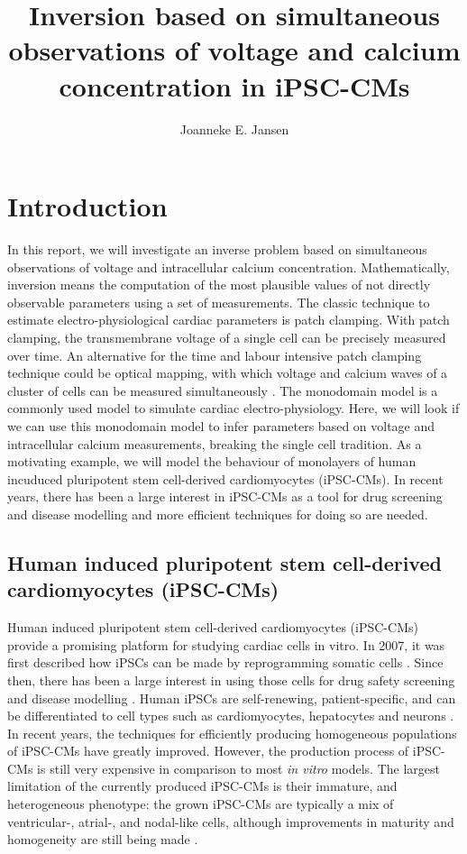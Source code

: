 \documentclass[12pt,a4paper]{article}
\title{Inversion based on simultaneous observations of voltage and calcium concentration in iPSC-CMs}
\author{Joanneke E. Jansen}
\begin{document}
%
\maketitle
%
\section{Introduction} \label{Introduction}
In this report, we will investigate an inverse problem based on simultaneous observations of voltage and intracellular calcium concentration. Mathematically, inversion means the computation of the most plausible values of not directly observable parameters using a set of measurements. The classic technique to estimate electro-physiological cardiac parameters is patch clamping. With patch clamping, the transmembrane voltage of a single cell can be precisely measured over time. An alternative for the time and labour intensive patch clamping technique could be optical mapping, with which voltage and calcium waves of a cluster of cells can be measured simultaneously \cite{Lee2012}. The monodomain model is a commonly used model to simulate cardiac electro-physiology. Here, we will look if we can use this monodomain model to infer parameters based on voltage and intracellular calcium measurements, breaking the single cell tradition. As a motivating example, we will model the behaviour of monolayers of human incuduced pluripotent stem cell-derived cardiomyocytes (iPSC-CMs). In recent years, there has been a large interest in iPSC-CMs as a tool for drug screening and disease modelling and more efficient techniques for doing so are needed.
%
\subsection{Human induced pluripotent stem cell-derived cardiomyocytes (iPSC-CMs)}
Human induced pluripotent stem cell-derived cardiomyocytes (iPSC-CMs) provide a promising platform for studying cardiac cells in vitro. In 2007, it was first described how iPSCs can be made by reprogramming somatic cells \cite{Takahashi2007}. Since then, there has been a large interest in using those cells for drug safety screening and disease modelling \cite{Sallam2016}. Human iPSCs are self-renewing, patient-specific, and can be differentiated to cell types such as cardiomyocytes, hepatocytes and neurons \cite{Rajamohan2013}. In recent years, the techniques for efficiently producing homogeneous populations of iPSC-CMs  have greatly improved. However, the production process of iPSC-CMs is still very expensive in comparison to most \textit{in vitro} models. The largest limitation of the currently produced iPSC-CMs is their immature, and heterogeneous phenotype: the grown iPSC-CMs are typically a mix of ventricular-, atrial-, and nodal-like cells, although improvements in maturity and homogeneity are still being made \cite{Denning2016}. 
%
\end{document}
